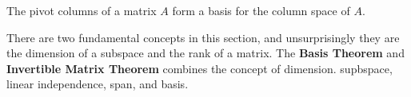 \begin{theorem}
The pivot columns of a matrix $A$ form a basis for the column space of $A$.
\end{theorem}

There are two fundamental concepts in this section, and unsurprisingly they are the dimension of a subspace and the rank of a matrix. The \textbf{Basis Theorem} and \textbf{Invertible Matrix Theorem} combines the concept of dimension. supbspace, linear independence, span, and basis.


